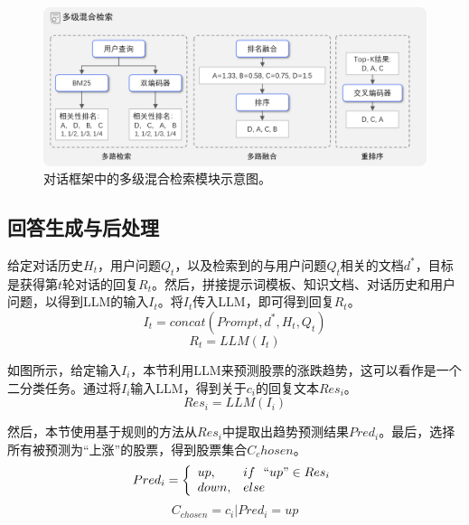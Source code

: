 
\begin{figure}[htbp]
	\centering
	\includegraphics[scale=0.55]{Fig/search_module.png}
	\caption{\label{search_module}对话框架中的多级混合检索模块示意图。}
\end{figure}

\subsection{回答生成与后处理}

给定对话历史$H_t$，用户问题$Q_t$，以及检索到的与用户问题$Q_t$相关的文档$d^*$，目标是获得第$t$轮对话的回复$R_t$。然后，拼接提示词模板、知识文档、对话历史和用户问题，以得到LLM的输入$I_t$。将$I_t$传入LLM，即可得到回复$R_t$。
\begin{equation}
	I_t = concat(Prompt, d^*, H_t, Q_t)
\end{equation}
\begin{equation}
	R_t = LLM(I_t)
\end{equation}

如图所示，给定输入$I_i$，本节利用LLM来预测股票的涨跌趋势，这可以看作是一个二分类任务。通过将$I_i$输入LLM，得到关于$c_i$的回复文本$Res_i$。
\begin{equation}
	Res_i = LLM(I_i)
\end{equation}

然后，本节使用基于规则的方法从$Res_i$中提取出趋势预测结果$Pred_i$。最后，选择所有被预测为“上涨”的股票，得到股票集合$C_chosen$。
\begin{equation}
    Pred_i = \left\{ 
        \begin{array}{ll}
            up, & if\ \ ``up" \in Res_i \\
            down, & else \\
        \end{array}
    \right.
\end{equation}
\begin{equation}
	C_{chosen}={c_i | Pred_i = up}
\end{equation}

